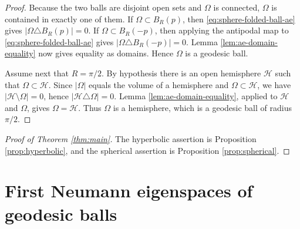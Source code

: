 \documentclass[10pt,a4paper]{amsart}
\begin{document}
\begin{proof}
Because the two balls are disjoint open sets and $\Omega$ is connected, $\Omega$ is contained in exactly one of them.  If $\Omega\subset B_R(p)$, then \eqref{eq:sphere-folded-ball-ae} gives $|\Omega\triangle B_R(p)|=0$.  If $\Omega\subset B_R(-p)$, then applying the antipodal map to \eqref{eq:sphere-folded-ball-ae} gives $|\Omega\triangle B_R(-p)|=0$.  Lemma \ref{lem:ae-domain-equality} now gives equality as domains.  Hence $\Omega$ is a geodesic ball.

Assume next that $R=\pi/2$.  By hypothesis there is an open hemisphere $\mathcal H$ such that $\Omega\subset\mathcal H$.  Since $|\Omega|$ equals the volume of a hemisphere and $\Omega\subset\mathcal H$, we have $|\mathcal H\setminus\Omega|=0$, hence $|\mathcal H\triangle\Omega|=0$.  Lemma \ref{lem:ae-domain-equality}, applied to $\mathcal H$ and $\Omega$, gives $\Omega=\mathcal H$.  Thus $\Omega$ is a hemisphere, which is a geodesic ball of radius $\pi/2$.
\end{proof}


\begin{proof}[Proof of Theorem \ref{thm:main}]
The hyperbolic assertion is Proposition \ref{prop:hyperbolic}, and the spherical assertion is Proposition \ref{prop:spherical}.
\end{proof}


\appendix

\section{First Neumann eigenspaces of geodesic balls}
\label{app:first-neumann-balls}
\end{document}
